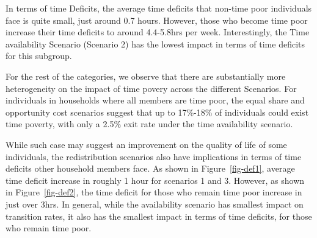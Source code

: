 \documentclass[
  11pt,
]{article}
\begin{document}
In terms of time Deficits, the average time deficits that non-time poor
individuals face is quite small, just around 0.7 hours. However, those
who become time poor increase their time deficits to around 4.4-5.8hrs
per week. Interestingly, the Time availability Scenario (Scenario 2) has
the lowest impact in terms of time deficits for this subgroup.

For the rest of the categories, we observe that there are substantially
more heterogeneity on the impact of time povery across the different
Scenarios. For individuals in households where all members are time
poor, the equal share and opportunity cost scenarios suggest that up to
17\%-18\% of individuals could exist time poverty, with only a 2.5\%
exit rate under the time availability scenario.

While such case may suggest an improvement on the quality of life of
some individuals, the redistribution scenarios also have implications in
terms of time deficits other household members face. As shown in
Figure~\ref{fig-def1}, average time deficit increase in roughly 1 hour
for scenarios 1 and 3. However, as shown in Figure~\ref{fig-def2}, the
time deficit for those who remain time poor increase in just over 3hrs.
In general, while the availability scenario has smallest impact on
transition rates, it also has the smallest impact in terms of time
deficits, for those who remain time poor.
\end{document}
